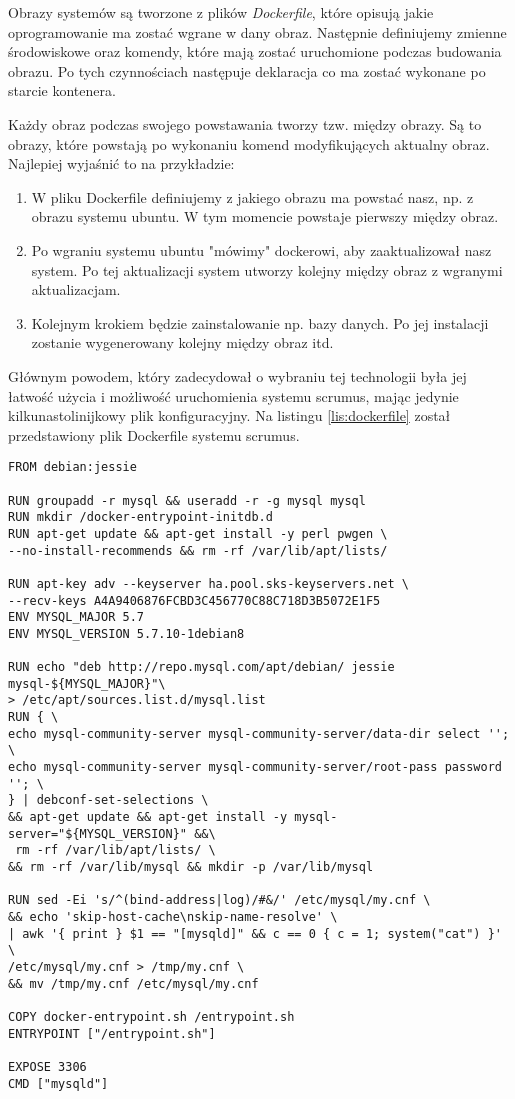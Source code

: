 Obrazy systemów są tworzone z plików \textit{Dockerfile}, które opisują jakie oprogramowanie ma zostać wgrane w dany obraz. Następnie definiujemy zmienne środowiskowe oraz komendy, które mają zostać uruchomione podczas budowania obrazu. Po tych czynnościach następuje deklaracja co ma zostać wykonane po starcie kontenera.

Każdy obraz podczas swojego powstawania tworzy tzw. między obrazy. Są to obrazy, które powstają po wykonaniu komend modyfikujących aktualny obraz. Najlepiej wyjaśnić to na przykładzie:

\begin{enumerate}
	\item W pliku Dockerfile definiujemy z jakiego obrazu ma powstać nasz, np. z obrazu systemu ubuntu. W tym momencie powstaje pierwszy między obraz.
	\item Po wgraniu systemu ubuntu "mówimy" dockerowi, aby zaaktualizował nasz system. Po tej aktualizacji system utworzy kolejny między obraz z wgranymi aktualizacjam.
	\item Kolejnym krokiem będzie zainstalowanie np. bazy danych. Po jej instalacji zostanie wygenerowany kolejny między obraz itd.
\end{enumerate}

Głównym powodem, który zadecydował o wybraniu tej technologii była jej łatwość użycia i możliwość uruchomienia systemu scrumus, mając jedynie kilkunastolinijkowy plik konfiguracyjny. Na listingu \ref{lis:dockerfile} został przedstawiony plik Dockerfile systemu scrumus.

\begin{lstlisting}[caption={Plik Dockerfile systemu scrumus}, label=lis:dockerfile, numbers=none]
FROM debian:jessie

RUN groupadd -r mysql && useradd -r -g mysql mysql
RUN mkdir /docker-entrypoint-initdb.d
RUN apt-get update && apt-get install -y perl pwgen \
--no-install-recommends && rm -rf /var/lib/apt/lists/

RUN apt-key adv --keyserver ha.pool.sks-keyservers.net \
--recv-keys A4A9406876FCBD3C456770C88C718D3B5072E1F5
ENV MYSQL_MAJOR 5.7
ENV MYSQL_VERSION 5.7.10-1debian8

RUN echo "deb http://repo.mysql.com/apt/debian/ jessie mysql-${MYSQL_MAJOR}"\
> /etc/apt/sources.list.d/mysql.list
RUN { \
echo mysql-community-server mysql-community-server/data-dir select ''; \
echo mysql-community-server mysql-community-server/root-pass password ''; \
} | debconf-set-selections \
&& apt-get update && apt-get install -y mysql-server="${MYSQL_VERSION}" &&\
 rm -rf /var/lib/apt/lists/ \
&& rm -rf /var/lib/mysql && mkdir -p /var/lib/mysql

RUN sed -Ei 's/^(bind-address|log)/#&/' /etc/mysql/my.cnf \
&& echo 'skip-host-cache\nskip-name-resolve' \
| awk '{ print } $1 == "[mysqld]" && c == 0 { c = 1; system("cat") }' \
/etc/mysql/my.cnf > /tmp/my.cnf \
&& mv /tmp/my.cnf /etc/mysql/my.cnf

COPY docker-entrypoint.sh /entrypoint.sh
ENTRYPOINT ["/entrypoint.sh"]

EXPOSE 3306
CMD ["mysqld"]\end{lstlisting}

